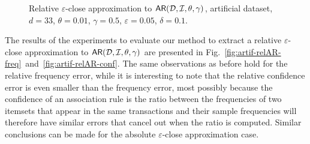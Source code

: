 \begin{figure}[tp]
  \centering
  \hfill
  \caption{ Relative $\varepsilon$-close approximation to
  $\mathsf{AR}({\cal D},{\cal I},\theta,\gamma)$, artificial dataset, $d=33$, $\theta=0.01$,
  $\gamma=0.5$, $\varepsilon=0.05$, $\delta=0.1$.}
  \label{fig:ar}
\end{figure}

The results of the experiments to evaluate our method to extract a relative
$\varepsilon$-close approximation to $\mathsf{AR}({\cal D},{\cal I},\theta,\gamma)$ are presented
in Fig.~\ref{fig:artif-relAR-freq}~and~\ref{fig:artif-relAR-conf}. The same
observations as before hold for the relative
frequency error, while it is interesting to note that the relative confidence
error is even smaller than the frequency error, most possibly because the
confidence of an association rule is the ratio between the frequencies of two
itemsets that appear in the same transactions and their sample frequencies will
therefore have similar errors that cancel out when the ratio is computed.
Similar conclusions can be made for the absolute $\varepsilon$-close
approximation case.

